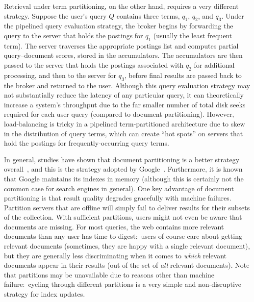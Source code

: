 Retrieval under term partitioning, on the other hand, requires a very
different strategy.  Suppose the user's query $Q$ contains three
terms, $q_1$, $q_2$, and $q_3$.  Under the pipelined query evaluation
strategy, the broker begins by forwarding the query to the server that
holds the postings for $q_1$ (usually the least frequent term).  The
server traverses the appropriate postings list and computes partial
query--document scores, stored in the accumulators.  The accumulators
are then passed to the server that holds the postings associated with
$q_2$ for additional processing, and then to the server for $q_3$,
before final results are passed back to the broker and returned to the
user.  Although this query evaluation strategy may not substantially
reduce the latency of any particular query, it can theoretically
increase a system's throughput due to the far smaller number of total
disk seeks required for each user query (compared to document
partitioning).  However, load-balancing is tricky in a pipelined
term-partitioned architecture due to skew in the distribution of query
terms, which can create ``hot spots'' on servers that hold the
postings for frequently-occurring query terms.

In general, studies have shown that document partitioning is a better
strategy overall~\cite{Moffat_etal_SIGIR2006}, and this is the
strategy adopted by Google~\cite{Barroso03}.  Furthermore, it is known
that Google maintains its indexes in memory (although this is
certainly not the common case for search engines in general).  One key
advantage of document partitioning is that result quality degrades
gracefully with machine failures.  Partition servers that are offline
will simply fail to deliver results for their subsets of the
collection.  With sufficient partitions, users might not even be aware
that documents are missing.  For most queries, the web contains
more relevant documents than any user has time to digest:\ users of
course care about getting relevant documents (sometimes, they are
happy with a single relevant document), but they are generally less
discriminating when it comes to \emph{which} relevant documents appear
in their results (out of the set of \emph{all} relevant documents).
Note that partitions may be unavailable due to reasons other than
machine failure:\ cycling through different partitions is a very
simple and non-disruptive strategy for index updates.

